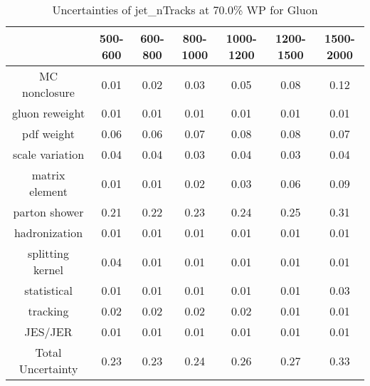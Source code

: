 \begin{table}
\centering
\caption{Uncertainties of jet_nTracks at 70.0\% WP for Gluon}
\label{tab:syst_jet_nTracks_0.7_Gluon}
\begin{tabular}{ccccccc}
\toprule
{} &  500-600 &  600-800 &  800-1000 &  1000-1200 &  1200-1500 &  1500-2000 \\
\midrule
MC nonclosure     &     0.01 &     0.02 &      0.03 &       0.05 &       0.08 &       0.12 \\
gluon reweight    &     0.01 &     0.01 &      0.01 &       0.01 &       0.01 &       0.01 \\
pdf weight        &     0.06 &     0.06 &      0.07 &       0.08 &       0.08 &       0.07 \\
scale variation   &     0.04 &     0.04 &      0.03 &       0.04 &       0.03 &       0.04 \\
matrix element    &     0.01 &     0.01 &      0.02 &       0.03 &       0.06 &       0.09 \\
parton shower     &     0.21 &     0.22 &      0.23 &       0.24 &       0.25 &       0.31 \\
hadronization     &     0.01 &     0.01 &      0.01 &       0.01 &       0.01 &       0.01 \\
splitting kernel  &     0.04 &     0.01 &      0.01 &       0.01 &       0.01 &       0.01 \\
statistical       &     0.01 &     0.01 &      0.01 &       0.01 &       0.01 &       0.03 \\
tracking          &     0.02 &     0.02 &      0.02 &       0.02 &       0.01 &       0.01 \\
JES/JER           &     0.01 &     0.01 &      0.01 &       0.01 &       0.01 &       0.01 \\
Total Uncertainty &     0.23 &     0.23 &      0.24 &       0.26 &       0.27 &       0.33 \\
\bottomrule
\end{tabular}
\end{table}
